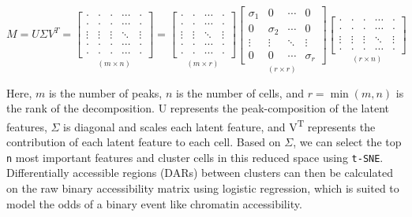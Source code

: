 \[
	M = U\Sigma V^T =
	\underset{(m \times n)}{\begin{bmatrix}
			\cdot  & \cdot  & \cdot  & \cdots & \cdot  \\
			\cdot  & \cdot  & \cdot  & \cdots & \cdot  \\
			\vdots & \vdots & \vdots & \ddots & \vdots \\
			\cdot  & \cdot  & \cdot  & \cdots & \cdot  \\
			\cdot  & \cdot  & \cdot  & \cdots & \cdot
		\end{bmatrix}}
	=
	\underset{(m \times r)}{\begin{bmatrix}
			\cdot  & \cdot  & \cdots & \cdot  \\
			\cdot  & \cdot  & \cdots & \cdot  \\
			\vdots & \vdots & \ddots & \vdots \\
			\cdot  & \cdot  & \cdots & \cdot  \\
			\cdot  & \cdot  & \cdots & \cdot
		\end{bmatrix}}
	\underset{(r \times r)}{\begin{bmatrix}
			\sigma_1 & 0        & \cdots & 0        \\
			0        & \sigma_2 & \cdots & 0        \\
			\vdots   & \vdots   & \ddots & \vdots   \\
			0        & 0        & \cdots & \sigma_r
		\end{bmatrix}}
	\underset{(r \times n)}{\begin{bmatrix}
			\cdot  & \cdot  & \cdot  & \cdots & \cdot  \\
			\cdot  & \cdot  & \cdot  & \cdots & \cdot  \\
			\vdots & \vdots & \vdots & \ddots & \vdots \\
			\cdot  & \cdot  & \cdot  & \cdots & \cdot
		\end{bmatrix}}
\]

Here, $m$ is the number of peaks, $n$ is the number of cells, and $r = \min(m,n)$ is the rank of the decomposition. U represents the peak-composition of the latent features, $\Sigma$ is diagonal and scales each latent feature, and V\textsuperscript{T} represents the contribution of each latent feature to each cell. Based on $\Sigma$, we can select the top \verb|n| most important features and cluster cells in this reduced space using \verb|t-SNE|. Differentially accessible regions (DARs) between clusters can then be calculated on the raw binary accessibility matrix using logistic regression, which is suited to model the odds of a binary event like chromatin accessibility.

